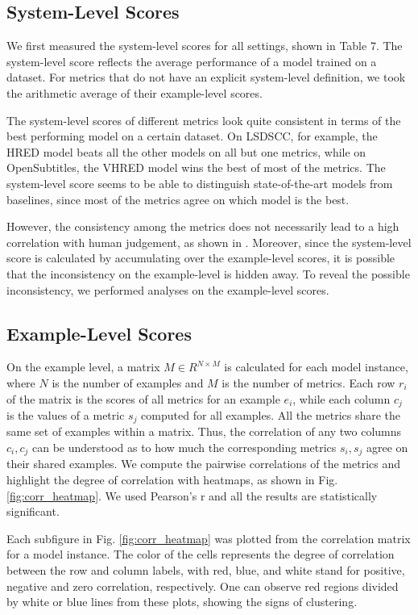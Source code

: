 \documentclass[conference]{IEEEtran}
\begin{document}
    \subsection{System-Level Scores}
    We first measured the system-level scores for all settings, shown in Table 7. The system-level score reflects the average performance of a model trained on a dataset. For metrics that do not have an explicit system-level definition, we took the arithmetic average of their example-level scores.
    

    The system-level scores of different metrics look quite consistent in terms of the best performing model on a certain dataset. On LSDSCC, for example, the HRED model beats all the other models on all but one metrics, while on OpenSubtitles, the VHRED model wins the best of most of the metrics. The system-level score seems to be able to distinguish state-of-the-art models from baselines, since most of the metrics agree on which model is the best.

    However, the consistency among the metrics does not necessarily lead to a high correlation with human judgement, as shown in \cite{HowNot}. Moreover, since the system-level score is calculated by accumulating over the example-level scores, it is possible that the inconsistency on the example-level is hidden away. To reveal the possible inconsistency, we performed analyses on the example-level scores.

    \subsection{Example-Level Scores}
    On the example level, a matrix $M \in R^{N \times M}$ is calculated for each model instance, where $N$ is the number of examples and $M$ is the number of metrics. Each row $r_i$ of the matrix is the scores of all metrics for an example $e_i$, while each column $c_j$ is the values of a metric $s_j$ computed for all examples. All the metrics share the same set of examples within a matrix. Thus, the correlation of any two columns $c_i, c_j$ can be understood as to how much the corresponding metrics $s_i, s_j$ agree on their shared examples. We compute the pairwise correlations of the metrics and highlight the degree of correlation with heatmaps, as shown in Fig. \ref{fig:corr_heatmap}. We used Pearson's r and all the results are statistically significant.

    

    Each subfigure in Fig. \ref{fig:corr_heatmap} was plotted from the correlation matrix for a model instance. The color of the cells represents the degree of correlation between the row and column labels, with red, blue, and white stand for positive, negative and zero correlation, respectively. One can observe red regions divided by white or blue lines from these plots, showing the signs of clustering.
\end{document}
